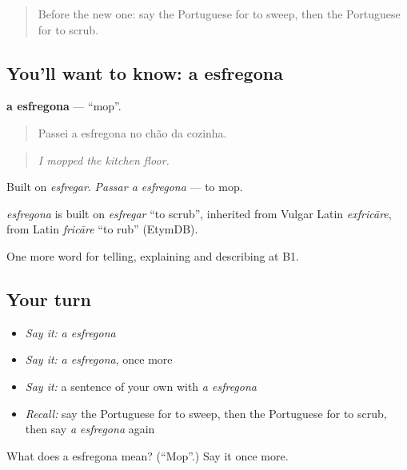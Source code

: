 \label{lesson:PT-C528-esfregona}



\begin{quote}
Before the new one: say the Portuguese for to sweep, then the Portuguese for to scrub.
\end{quote}

\subsection*{You'll want to know: a esfregona}
\textbf{a esfregona} — \textquotedblleft{}mop\textquotedblright{}.

\begin{quote}
Passei a esfregona no chão da cozinha.
\end{quote}

\begin{quote}
\emph{I mopped the kitchen floor.}
\end{quote}

Built on \emph{esfregar}. \emph{Passar a esfregona} — to mop.

\begin{cousinweb}
\emph{esfregona} is built on \emph{esfregar} \textquotedblleft{}to scrub\textquotedblright{}, inherited from Vulgar Latin \emph{exfricāre}, from Latin \emph{fricāre} \textquotedblleft{}to rub\textquotedblright{} (EtymDB).
\end{cousinweb}

\begin{grammarlens}[title={What you've built}]
One more word for telling, explaining and describing at B1.
\end{grammarlens}

\subsection*{Your turn}
\begin{itemize}
\raggedright
  \item \emph{Say it:} \emph{a esfregona}
  \item \emph{Say it:} \emph{a esfregona}, once more
  \item \emph{Say it:} a sentence of your own with \emph{a esfregona}
  \item \emph{Recall:} say the Portuguese for to sweep, then the Portuguese for to scrub, then say \emph{a esfregona} again
\end{itemize}

\begin{tcolorbox}[breakable,colback=teal!4,colframe=teal!35!black,title={Before you move on}]
What does a esfregona mean? (\textquotedblleft{}Mop\textquotedblright{}.) Say it once more.
\end{tcolorbox}
